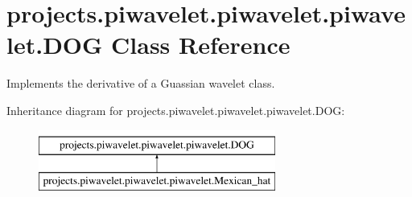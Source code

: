 \hypertarget{classprojects_1_1piwavelet_1_1piwavelet_1_1piwavelet_1_1DOG}{\section{projects.\-piwavelet.\-piwavelet.\-piwavelet.\-D\-O\-G Class Reference}
\label{classprojects_1_1piwavelet_1_1piwavelet_1_1piwavelet_1_1DOG}
}


Implements the derivative of a Guassian wavelet class.  


Inheritance diagram for projects.\-piwavelet.\-piwavelet.\-piwavelet.\-D\-O\-G\-:\begin{figure}[H]
\begin{center}
\leavevmode
\includegraphics[height=2.000000cm]{classprojects_1_1piwavelet_1_1piwavelet_1_1piwavelet_1_1DOG}
\end{center}
\end{figure}
